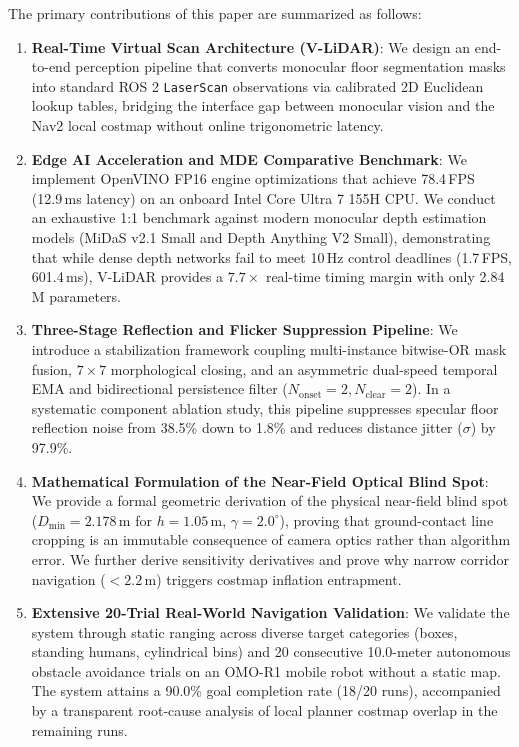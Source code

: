 \documentclass{ieeeaccess}
\begin{document}
The primary contributions of this paper are summarized as follows:
\begin{enumerate}
  \item \textbf{Real-Time Virtual Scan Architecture (V-LiDAR)}: We design an end-to-end perception pipeline that converts monocular floor segmentation masks into standard ROS 2 \texttt{LaserScan} observations via calibrated 2D Euclidean lookup tables, bridging the interface gap between monocular vision and the Nav2 local costmap without online trigonometric latency.
  \item \textbf{Edge AI Acceleration and MDE Comparative Benchmark}: We implement OpenVINO FP16 engine optimizations that achieve 78.4\,FPS (12.9\,ms latency) on an onboard Intel Core Ultra 7 155H CPU. We conduct an exhaustive 1:1 benchmark against modern monocular depth estimation models (MiDaS v2.1 Small and Depth Anything V2 Small), demonstrating that while dense depth networks fail to meet 10\,Hz control deadlines (1.7\,FPS, 601.4\,ms), V-LiDAR provides a $7.7\times$ real-time timing margin with only 2.84\,M parameters.
  \item \textbf{Three-Stage Reflection and Flicker Suppression Pipeline}: We introduce a stabilization framework coupling multi-instance bitwise-OR mask fusion, $7 \times 7$ morphological closing, and an asymmetric dual-speed temporal EMA and bidirectional persistence filter ($N_{\mathrm{onset}}=2, N_{\mathrm{clear}}=2$). In a systematic component ablation study, this pipeline suppresses specular floor reflection noise from 38.5\% down to 1.8\% and reduces distance jitter ($\sigma$) by 97.9\%.
  \item \textbf{Mathematical Formulation of the Near-Field Optical Blind Spot}: We provide a formal geometric derivation of the physical near-field blind spot ($D_{\min} = 2.178$\,m for $h = 1.05$\,m, $\gamma = 2.0^\circ$), proving that ground-contact line cropping is an immutable consequence of camera optics rather than algorithm error. We further derive sensitivity derivatives and prove why narrow corridor navigation ($<2.2$\,m) triggers costmap inflation entrapment.
  \item \textbf{Extensive 20-Trial Real-World Navigation Validation}: We validate the system through static ranging across diverse target categories (boxes, standing humans, cylindrical bins) and 20 consecutive 10.0-meter autonomous obstacle avoidance trials on an OMO-R1 mobile robot without a static map. The system attains a 90.0\% goal completion rate (18/20 runs), accompanied by a transparent root-cause analysis of local planner costmap overlap in the remaining runs.
\end{enumerate}
\end{document}
